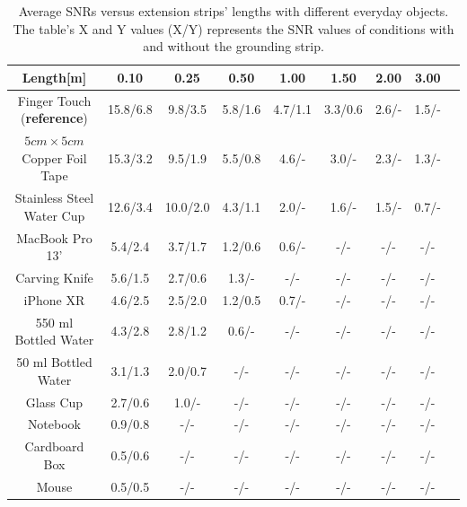 \begin{table}[ht]
\caption{Average SNRs versus extension strips' lengths with different everyday objects. The table's X and  Y values (X/Y) represents the SNR values of conditions with and without the grounding strip. }
\vspace{-2mm}
	\centering
		\begin{tabular}{|c|c|c|c|c|c|c|c|c|}
		\hline
		\textbf{Length[m]} & \textbf{0.10} & \textbf{0.25} & \textbf{0.50} & \textbf{1.00} & \textbf{1.50} & \textbf{2.00} & \textbf{3.00} \\
		\hline
		Finger Touch (\textbf{reference}) & 15.8/6.8 & 9.8/3.5 & 5.8/1.6 & 4.7/1.1 & 3.3/0.6 & 2.6/- & 1.5/-  \\\hline
		$5 cm\times 5 cm$ Copper Foil Tape & 15.3/3.2 & 9.5/1.9 & 5.5/0.8 & 4.6/- & 3.0/- & 2.3/- & 1.3/-  \\\hline
		Stainless Steel Water Cup &  12.6/3.4 & 10.0/2.0 & 4.3/1.1 & 2.0/- & 1.6/- & 1.5/- & 0.7/-  \\\hline
		MacBook Pro 13' &  5.4/2.4 & 3.7/1.7 & 1.2/0.6 & 0.6/- & -/- & -/- & -/- \\\hline
		Carving Knife  & 5.6/1.5 & 2.7/0.6 & 1.3/- & -/- & -/- & -/- & -/-  \\\hline
		iPhone XR  & 4.6/2.5 & 2.5/2.0 & 1.2/0.5 & 0.7/- & -/- & -/- & -/- \\\hline
		550 ml Bottled Water  &  4.3/2.8 & 2.8/1.2 & 0.6/- & -/- & -/- & -/- & -/- \\\hline
		50 ml Bottled Water  &  3.1/1.3 & 2.0/0.7 &  -/- & -/- & -/- & -/- & -/- \\\hline
		Glass Cup &  2.7/0.6 & 1.0/- & -/- & -/- & -/- & -/- & -/-  \\\hline
		Notebook & 0.9/0.8 & -/- & -/- & -/- & -/- & -/- & -/-   \\\hline
		Cardboard Box  & 0.5/0.6 & -/- & -/- & -/- & -/- & -/- & -/-  \\\hline
		Mouse & 0.5/0.5 & -/- & -/- & -/- & -/- & -/- & -/- \\\hline
		\end{tabular}
		
		\label{tab:snrtableforobj}
		
	\end{table}


